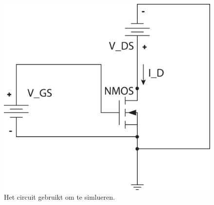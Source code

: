 \documentclass{scrartcl}  %
\begin{document}
\begin{figure}[H]
\centering
		\includegraphics[width=\textwidth]{resources/NMOS_circuit}
		\caption{Het circuit gebruikt om te simlueren.}
		\label{fig:circuit}
\end{figure}
\end{document}
